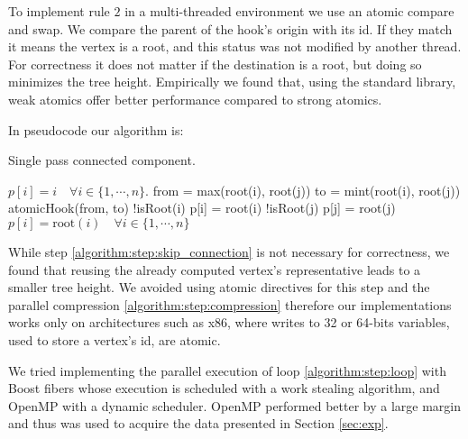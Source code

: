 To implement rule $2$ in a multi-threaded environment we use an atomic
compare and swap.
We compare the parent of the hook's origin with its id. If they
match it means the vertex is a root, and this status was not modified by another thread.
For correctness it does not matter if the %
destination is a root, but doing so minimizes the tree height. %
Empirically we found that, using the standard library, weak atomics offer better performance compared to
strong atomics.

In pseudocode our algorithm is:

\begin{algorithm}[H]
    \caption{Single pass connected component.}
    \label{algorithm:cc2}
    \begin{algorithmic}[1]
        \State $p[i] = i \quad \forall i \in \{1,\cdots, n\}$.
         
\label{algorithm:step:loop}
                \State from = max(root(i), root(j))
                \State to = mint(root(i), root(j))
                \State  atomicHook(from, to)
        \EndWhile
        \State  \kif !isRoot(i) \kthen p[i] = root(i) \label{algorithm:step:skip_connection}
        \State  \kif !isRoot(j) \kthen p[j] = root(j)
        \EndFor
        \State $p[i] = \text{root}(i) \quad \forall i \in \{1,\cdots, n\}$  \label{algorithm:step:compression}
        \EndProcedure
    \end{algorithmic}
\end{algorithm}

While step \ref{algorithm:step:skip_connection} is not necessary for correctness, we found that
reusing the already computed vertex's representative leads to a smaller tree height.
We avoided using atomic directives for this step and
the parallel compression \ref{algorithm:step:compression}
therefore our implementations works only on architectures such as x86, where writes to 32 or 64-bits variables, used to store a
vertex's id, are atomic.

We tried implementing the parallel execution of loop \ref{algorithm:step:loop} with  Boost fibers
\cite{Boost}
whose execution is scheduled with a work stealing algorithm, and OpenMP with a dynamic scheduler.
OpenMP performed better by a large margin and thus was used to acquire the
data presented in Section \ref{sec:exp}.

